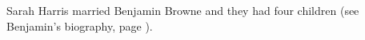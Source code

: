 
Sarah Harris married Benjamin Browne and they had four children (see Benjamin's biography, page \pageref{Benjamin_Browne}).
